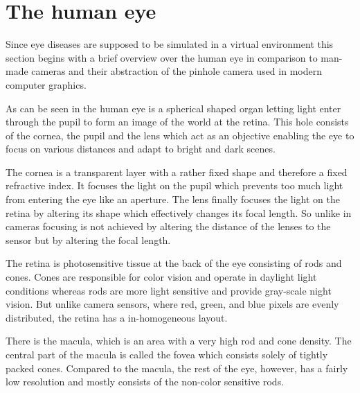 \documentclass{sig-alternate-05-2015}
\begin{document}
\section{The human eye}
Since eye diseases are supposed to be simulated in a virtual environment this section begins with a brief overview over the human eye in comparison to man-made cameras and their abstraction of the pinhole camera used in modern computer graphics.

As can be seen in  the human eye is a spherical shaped organ letting light enter through the pupil to form an image of the world at the retina.
This hole consists of the cornea, the pupil and the lens which act as an objective enabling the eye to focus on various distances and adapt to bright and dark scenes.

The cornea is a transparent layer with a rather fixed shape and therefore a fixed refractive index.
It focuses the light on the pupil which prevents too much light from entering the eye like an aperture.
The lens finally focuses the light on the retina by altering its shape which effectively changes its focal length.
So unlike in cameras focusing is not achieved by altering the distance of the lenses to the sensor but by altering the focal length.

The retina is photosensitive tissue at the back of the eye consisting of rods and cones.
Cones are responsible for color vision and operate in daylight light conditions whereas rods are more light sensitive and provide gray-scale night vision.
But unlike camera sensors, where red, green, and blue pixels are evenly distributed, the retina has a in-homogeneous layout.

There is the macula, which is an area with a very high rod and cone density.
The central part of the macula is called the fovea which consists solely of tightly packed cones.
Compared to the macula, the rest of the eye, however, has a fairly low resolution and mostly consists of the non-color sensitive rods.
\end{document}
